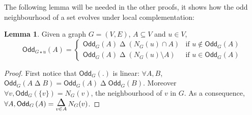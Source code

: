 \documentclass[a4paper,onecolumn,superscriptaddress,11pt,accepted=2020-04-27]{quantumarticle}
\newcommand{\symd}{\mathbin{\Delta}\xspace}
\newcommand{\Symdi}[1]{\underset{\scriptstyle #1}{\scalebox{1.5}{$\symd$}}\,}
\newcommand{\odd}[2]{\textsf{Odd}_{#1}\left(#2\right)}
\theoremstyle{definition}
\newtheorem{lemma}[theorem]{Lemma}
\begin{document}
The following lemma will be needed in the other proofs, it shows how the odd neighbourhood of a set evolves under local complementation:
\begin{lemma}\label{lem:oddneighbours}
Given a graph $G=(V,E)$, $A\subseteq V$ and $u \in V$, $$\odd {G\star u} A=\begin{cases}\odd G A \symd (N_G(u)\cap A) & \text{if $u\notin \odd G A$}\\ \odd G {A} \symd (N_G(u)\setminus A)&\text{if $u\in \odd G A$}\end{cases}$$
\end{lemma}
\begin{proof}
First notice that $\odd G .$ is linear: 
$\forall A, B$, $\odd G {A\symd B} = \odd G A \symd \odd G B$. 
Moreover $\forall v, \odd G {\{v\}} = N_G(v)$, the neighbourhood of $v$ in $G$. 
As a consequence, $\forall A, \odd G A  =\Symdi{v\in A} N_G (v)$. 


\end{proof}
\end{document}
